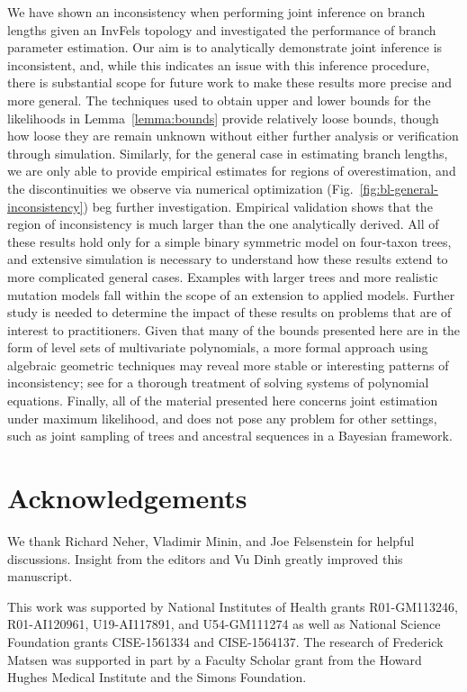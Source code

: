 \documentclass[11pt]{article}
\newcommand{\beginsupplement}{%
        \setcounter{table}{0}
        \renewcommand{\thetable}{S\arabic{table}}%
        \setcounter{figure}{0}
        \renewcommand{\thefigure}{S\arabic{figure}}%
     }
\begin{document}
We have shown an inconsistency when performing joint inference on branch lengths given an InvFels topology and investigated the performance of branch parameter estimation.
Our aim is to analytically demonstrate joint inference is inconsistent, and, while this indicates an issue with this inference procedure, there is substantial scope for future work to make these results more precise and more general.
The techniques used to obtain upper and lower bounds for the likelihoods in Lemma~\ref{lemma:bounds} provide relatively loose bounds, though how loose they are remain unknown without either further analysis or verification through simulation.
Similarly, for the general case in estimating branch lengths, we are only able to provide empirical estimates for regions of overestimation, and the discontinuities we observe via numerical optimization (Fig.~\ref{fig:bl-general-inconsistency}) beg further investigation.
Empirical validation shows that the region of inconsistency is much larger than the one analytically derived.
All of these results hold only for a simple binary symmetric model on four-taxon trees, and extensive simulation is necessary to understand how these results extend to more complicated general cases.
Examples with larger trees and more realistic mutation models fall within the scope of an extension to applied models.
Further study is needed to determine the impact of these results on problems that are of interest to practitioners.
Given that many of the bounds presented here are in the form of level sets of multivariate polynomials, a more formal approach using algebraic geometric techniques may reveal more stable or interesting patterns of inconsistency; see \citet{Sturmfels2002} for a thorough treatment of solving systems of polynomial equations.
Finally, all of the material presented here concerns joint estimation under maximum likelihood, and does not pose any problem for other settings, such as joint sampling of trees and ancestral sequences in a Bayesian framework.


\section*{Acknowledgements}
We thank Richard Neher, Vladimir Minin, and Joe Felsenstein for helpful discussions.
Insight from the editors and Vu Dinh greatly improved this manuscript.

This work was supported by National Institutes of Health grants R01-GM113246, R01-AI120961, U19-AI117891, and U54-GM111274 as well as National Science Foundation grants CISE-1561334 and CISE-1564137.
The research of Frederick Matsen was supported in part by a Faculty Scholar grant from the Howard Hughes Medical Institute and the Simons Foundation.




\newpage
\beginsupplement


\end{document}
